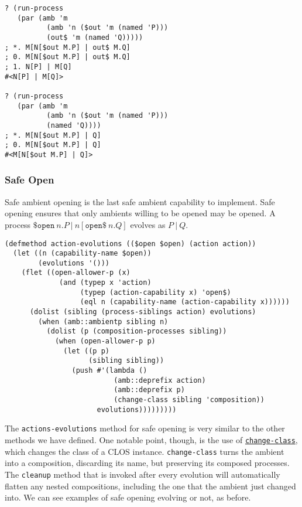 \documentclass[12pt]{article}
\begin{document}
\begin{verbatim}
? (run-process 
   (par (amb 'm
          (amb 'n ($out 'm (named 'P)))
          (out$ 'm (named 'Q)))))
; *. M[N[$out M.P] | out$ M.Q]
; 0. M[N[$out M.P] | out$ M.Q]
; 1. N[P] | M[Q]
#<N[P] | M[Q]>

? (run-process 
   (par (amb 'm
          (amb 'n ($out 'm (named 'P)))
          (named 'Q))))
; *. M[N[$out M.P] | Q]
; 0. M[N[$out M.P] | Q]
#<M[N[$out M.P] | Q]>
\end{verbatim}

\subsubsection{Safe Open}
\label{sec:safe-open}

Safe ambient opening is the last safe ambient capability to implement.
Safe opening ensures that only ambients willing to be opened may be opened.
A process $\mathtt{\$open}\ n.P\ |\ n[\mathtt{open\$}\ n.Q]$ evolves as $P\ |\ Q$.

\begin{verbatim}
(defmethod action-evolutions (($open $open) (action action))
  (let ((n (capability-name $open))
        (evolutions '()))
    (flet ((open-allower-p (x)
             (and (typep x 'action)
                  (typep (action-capability x) 'open$)
                  (eql n (capability-name (action-capability x))))))
      (dolist (sibling (process-siblings action) evolutions)
        (when (amb::ambientp sibling n)
          (dolist (p (composition-processes sibling))
            (when (open-allower-p p)
              (let ((p p)
                    (sibling sibling))
                (push #'(lambda ()
                          (amb::deprefix action)
                          (amb::deprefix p)
                          (change-class sibling 'composition))
                      evolutions)))))))))
\end{verbatim}

The \texttt{actions-evolutions} method for safe opening is very similar to the other methods we have defined.
One notable point, though, is the use of \href{http://www.lispworks.com/documentation/HyperSpec/Body/f_chg_cl.htm}{\texttt{change-class}}, which changes the class of a CLOS instance.
\texttt{change-class} turns the ambient into a composition, discarding its name, but preserving its composed processes.
The \texttt{cleanup} method that is invoked after every evolution will automatically flatten any nested compositions, including the one that the ambient just changed into.
We can see examples of safe opening evolving or not, as before.
\end{document}
